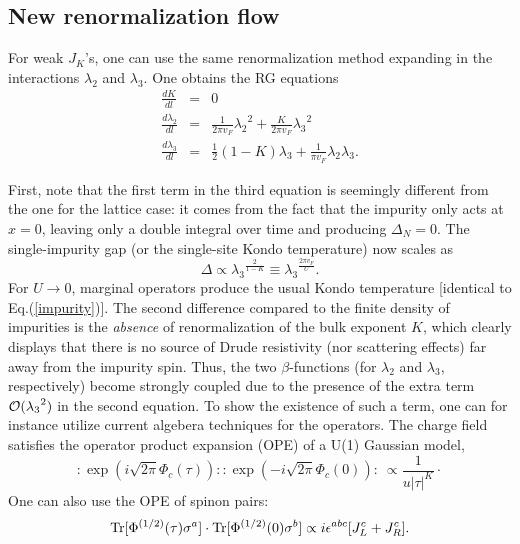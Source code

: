 \subsection{New renormalization flow}

For weak $J_K$'s, one can use the same renormalization method
expanding in the interactions $\lambda_2$ and $\lambda_3$. One obtains the
RG equations
\begin{eqnarray}
\label{ali}
\frac{dK}{dl}&=& 0\\ \nonumber
\frac{d\lambda_2}{dl}&=&\frac{1}{2\pi v_F}{\lambda_2}^2+\frac{K}{2\pi
  v_F}{\lambda_3}^2\\ \nonumber
\frac{d\lambda_3}{dl}&=&\frac{1}{2}(1-K)\lambda_3+\frac{1}{\pi
  v_F}\lambda_2\lambda_3.
\end{eqnarray}

First, note that the first term in the third equation is seemingly different
from the one for the lattice case: it comes from the fact that the impurity
only acts at $x=0$, leaving only a double integral over time and
producing $\Delta_N=0$. The single-impurity gap (or 
the single-site Kondo temperature) now scales as
\begin{equation}
\label{gapi}
\Delta\propto {\lambda_3}^{\frac{2}{1-K}}\equiv 
{\lambda_3}^{\frac{2\pi v_F}{U}}.
\end{equation}
For $U\rightarrow 0$, marginal operators produce the usual Kondo temperature
[identical to Eq.(\ref{impurity})].
\vskip 0.1cm
The second difference compared to the finite density of impurities is the
{\it absence} of renormalization of the bulk exponent $K$, which clearly
displays that there is no source of Drude resistivity (nor scattering
effects) far away from the impurity spin.
Thus, the two $\beta$-functions (for $\lambda_2$ and $\lambda_3$, 
respectively)
become strongly coupled due to the presence of the extra term ${\cal 
O}({\lambda_3}^2)$ in the second equation. 
To show the existence of such 
a term, one can for instance utilize current algebera techniques
for the operators\cite{Ludwig}. 
\vskip 0.1cm
The charge field satisfies the operator
product expansion (OPE) of a U(1) Gaussian
model,
\begin{equation}
\label{1}
:\exp(i\sqrt{2\pi}\Phi_c(\tau))::\exp(-i\sqrt{2\pi}\Phi_c(0)):\ 
\propto\frac{1}{u\left|\tau\right|^K}\cdot
\end{equation}
One can also use the OPE of spinon pairs:
\begin{equation}
\label{2}
\hbox{Tr}[\Phi^{(1/2)}(\tau){\sigma}^a]
\cdot\hbox{Tr}[\Phi^{(1/2)}(0){\sigma}^b]\propto
i\epsilon^{abc}[J_L^c+J_R^c].
\end{equation}
